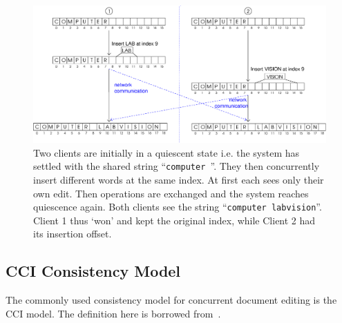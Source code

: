 \documentclass[12pt,a4paper,twoside,openright]{report}
\begin{document}
	\begin{figure}[htb]
	\centering
	\includegraphics[width=1\linewidth]{figs/reconcile.eps}
	\caption[Achieving Conflict Free Text Editing]{Two clients are initially in a quiescent state i.e. the system has settled with the shared string ``\texttt{computer }''. They then concurrently insert different words at the same index. At first each sees only their own edit. Then operations are exchanged and the system reaches quiescence again. Both clients see the string ``\texttt{computer labvision}''. Client 1 thus `won' and kept the original index, while Client 2 had its insertion offset.}
	\label{fig:reconcile}
	\end{figure}
	
	\subsection{CCI Consistency Model} 	\label{sec:cciconsistency}
	The commonly used consistency model for concurrent document editing is the CCI model. The definition here is borrowed from~\cite{weiss2010undo}.
	
\end{document}
